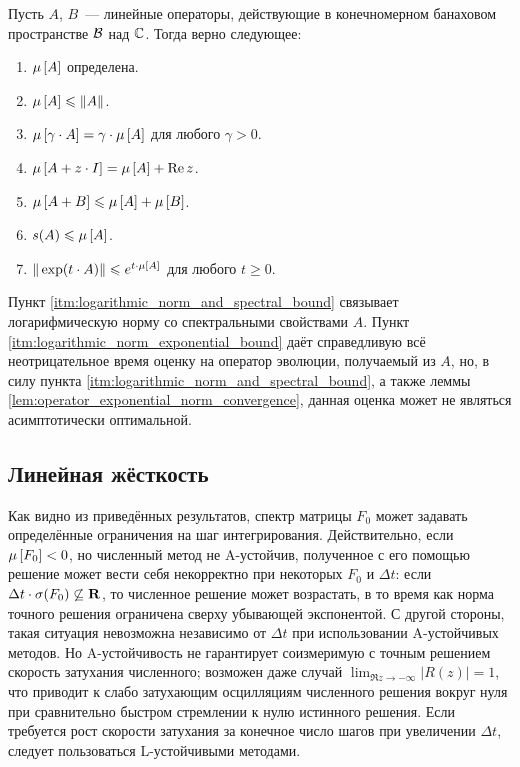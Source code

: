 \begin{statement}
    \label{stat:logarithmic_norm_properties}
    Пусть $ A $, $ B $~--- линейные операторы, действующие в конечномерном банаховом пространстве $ \mathcal{B} $ над $ \mathbb{C} $.
    Тогда верно следующее:
    \begin{enumerate}[itemsep=0em]
        \item $ \mu \left[ A \right] $ определена.
        \item $ \mu \left[ A \right] \leqslant \| A \| $.
        \item $ \mu \left[ \gamma \cdot A \right] = \gamma \cdot \mu \left[ A \right] $ для любого $ \gamma > 0 $.
        \item $ \mu \left[ A + z \cdot I \right] = \mu \left[ A \right] + \operatorname{Re} z $.
        \item $ \mu \left[ A + B \right] \leqslant \mu \left[ A \right] + \mu \left[ B \right] $.
        \item $ s(A) \leqslant \mu \left[ A \right] $. \label{itm:logarithmic_norm_and_spectral_bound}
        \item $ \| \exp(t \cdot A) \| \leqslant e^{t \cdot \mu \left[ A \right]} $ для любого $ t \geqslant 0 $. \label{itm:logarithmic_norm_exponential_bound}
    \end{enumerate}
\end{statement}

Пункт \ref{itm:logarithmic_norm_and_spectral_bound} связывает логарифмическую норму со спектральными свойствами $ A $.
Пункт \ref{itm:logarithmic_norm_exponential_bound} даёт справедливую всё неотрицательное время оценку на оператор эволюции,
получаемый из $ A $, но, в силу пункта \ref{itm:logarithmic_norm_and_spectral_bound},
а также леммы \ref{lem:operator_exponential_norm_convergence},
данная оценка может не являться асимптотически оптимальной.


\subsection{Линейная жёсткость}
\label{subsec:linear_stiffness}

Как видно из приведённых результатов, спектр матрицы $ F_0 $ может задавать определённые ограничения на шаг интегрирования.
Действительно, если $ \mu \left[ F_0 \right] < 0 $, но численный метод не A-устойчив, полученное с его помощью решение может вести себя некорректно при некоторых $ F_0 $ и $ \Delta t $:
если $ \Delta t \cdot \sigma(F_0) \not\subseteq \mathbf{R} $, то численное решение может возрастать,
в то время как норма точного решения ограничена сверху убывающей экспонентой.
С другой стороны, такая ситуация невозможна независимо от $ \Delta t $ при использовании A-устойчивых методов.
Но A-устойчивость не гарантирует соизмеримую с точным решением скорость затухания численного; возможен даже случай $ \displaystyle \lim_{\Re z \to -\infty} |R(z)| = 1 $,
что приводит к слабо затухающим осцилляциям численного решения вокруг нуля при сравнительно быстром стремлении к нулю истинного решения.
Если требуется рост скорости затухания за конечное число шагов при увеличении $ \Delta t $, следует пользоваться L-устойчивыми методами.

